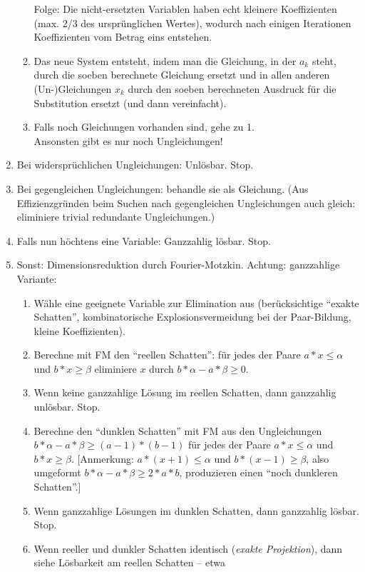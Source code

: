 \begin{enumerate}
\begin{enumerate}
    Folge: Die nicht-ersetzten Variablen haben echt kleinere
    Koeffizienten (max. 2/3 des ursprünglichen Wertes), wodurch nach
    einigen Iterationen Koeffizienten vom Betrag eins entstehen.
  \item Das neue System entsteht, indem man die Gleichung, in der $a_k$
    steht, durch die soeben berechnete Gleichung ersetzt und in allen
    anderen (Un-)Gleichungen $x_k$ durch den soeben berechneten Ausdruck 
    für die Substitution ersetzt (und dann vereinfacht).
  \item Falls noch Gleichungen vorhanden sind, gehe zu 1. \\
    Ansonsten gibt es nur noch Ungleichungen!
  \end{enumerate}
\item Bei widersprüchlichen Ungleichungen: Unlösbar. Stop.
\item Bei gegengleichen Ungleichungen: behandle sie als Gleichung.
  (Aus Effizienzgründen beim Suchen nach gegengleichen Ungleichungen
  auch gleich: eliminiere trivial redundante Ungleichungen.)
\item Falls nun höchtens eine Variable: Ganzzahlig lösbar. Stop.
\item Sonst: Dimensionsreduktion durch Fourier-Motzkin. Achtung:
  ganzzahlige Variante:
  \begin{enumerate}
  \item Wähle eine geeignete Variable zur Elimination aus
    (berücksichtige ``exakte Schatten'', kombinatorische
    Explosionsvermeidung bei der Paar-Bildung, kleine Koeffizienten).
  \item Berechne mit FM den ``reellen Schatten'': für jedes der Paare
    $a*x\leq \alpha$ und $b*x\geq \beta$ eliminiere $x$ durch $b*\alpha - a*\beta \geq 0$.
  \item Wenn keine ganzzahlige Lösung im reellen Schatten, dann
      ganzzahlig unlösbar. Stop.
  \item Berechne den ``dunklen Schatten'' mit FM aus den Ungleichungen
    $b*\alpha - a*\beta \geq (a\!-\!1)*(b\!-\!1)$ für jedes der Paare
    $a*x\leq \alpha$ und $b*x\geq \beta$. [Anmerkung: $a*(x\!+\!1)\leq \alpha$ und
    $b*(x\!-\!1)\geq \beta$, also umgeformt $b*\alpha - a*\beta \geq 2*a*b$,
    produzieren einen ``noch dunkleren Schatten''.] 
  \item Wenn ganzzahlige Lösungen im dunklen Schatten, dann ganzzahlig
    lösbar. Stop.
  \item Wenn reeller und dunkler Schatten identisch (\emph{exakte
      Projektion}), dann siehe Lösbarkeit am reellen Schatten -- etwa

\end{enumerate}
\end{enumerate}
